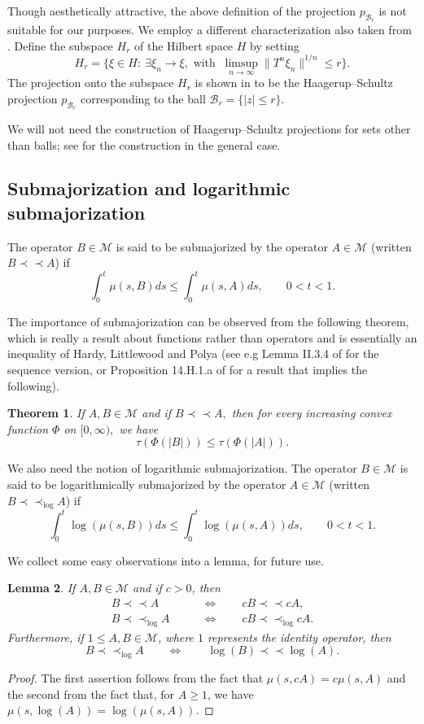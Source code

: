 \documentclass{amsart}
\theoremstyle{plain}
\newtheorem{thm}{Theorem}
\newtheorem{lem}[thm]{Lemma}
\theoremstyle{remark}
\begin{document}
Though aesthetically attractive, the above definition of the projection $p_{\mathcal{B}_r}$ is not suitable for our purposes. We employ a different characterization also taken from \cite{HS2}. Define the subspace $H_r$ of the Hilbert space $H$ by setting
\begin{equation}\label{eq:H-S H_r}
H_r=\{\xi\in H:\ \exists\xi_n\to\xi,\text{ with }\ \limsup_{n\to\infty}\|T^n\xi_n\|^{1/n}\leq r\}.
\end{equation}
The projection onto the subspace $H_r$ is shown in \cite{HS2} to be the Haagerup--Schultz projection $p_{\mathcal{B}_r}$ corresponding to the ball $\mathcal{B}_r=\{|z|\leq r\}.$

We will not need the construction of Haagerup--Schultz projections for sets other than balls; see \cite{HS2} for the construction in the general case.

\subsection{Submajorization and logarithmic submajorization}

The operator $B\in\mathcal{M}$ is said to be submajorized by the operator $A\in\mathcal{M}$ (written $B\prec\prec A$) if
$$\int_0^t\mu(s,B)ds\leq\int_0^t\mu(s,A)ds,\qquad 0<t<1.$$

The importance of submajorization can be observed from the following theorem, which is really a result about functions rather than operators and is
essentially an inequality of Hardy, Littlewood and Polya (see e.g Lemma II.3.4 of \cite{GK1} for the sequence version, or Proposition 14.H.1.a of \cite{MOA} for a result that implies the following).

\begin{thm}\label{hlp theorem} If $A,B\in\mathcal{M}$ and if $B\prec\prec A,$ then for every increasing convex function $\Phi$ on $[0,\infty),$ we have
$$\tau(\Phi(|B|))\leq\tau(\Phi(|A|)).$$
\end{thm}

We also need the notion of logarithmic submajorization. The operator $B\in\mathcal{M}$ is said to be logarithmically submajorized by the operator $A\in\mathcal{M}$ (written $B\prec\prec_{\log}A$) if
$$\int_0^t\log(\mu(s,B))ds\leq\int_0^t\log(\mu(s,A))ds,\qquad 0<t<1.$$

We collect some easy observations into a lemma, for future use.
\begin{lem}\label{lem:log invertibles}
If $A,B\in\mathcal{M}$ and if $c>0$, then 
\begin{align*}
B\prec\prec A \qquad&\Leftrightarrow\qquad cB\prec\prec cA, \\
B\prec\prec_{\log}A \qquad&\Leftrightarrow\qquad cB\prec\prec_{\log}cA. 
\end{align*}
Furthermore,
if $1\le A,B\in\mathcal{M}$, where $1$ represents the identity operator,
then
\[
B\prec\prec_{\log} A\qquad\Leftrightarrow\qquad \log(B)\prec\prec\log(A).
\]
\end{lem}
\begin{proof}
The first assertion follows from the fact that $\mu(s,cA)=c\mu(s,A)$ and the second from the fact that,
for $A\ge1$, we have $\mu(s,\log(A))=\log(\mu(s,A))$.
\end{proof}
\end{document}
